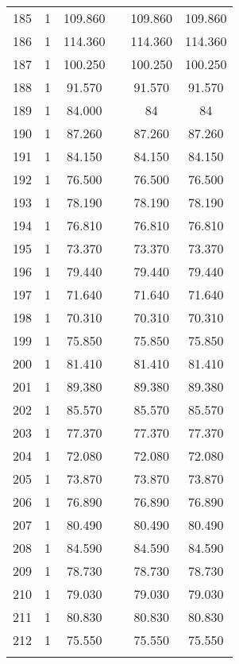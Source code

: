 \begin{table}[!htbp]
\begin{tabular}{@{\extracolsep{5pt}}lccccc}
185 & 1 & 109.860 &  & 109.860 & 109.860 \\ 
186 & 1 & 114.360 &  & 114.360 & 114.360 \\ 
187 & 1 & 100.250 &  & 100.250 & 100.250 \\ 
188 & 1 & 91.570 &  & 91.570 & 91.570 \\ 
189 & 1 & 84.000 &  & 84 & 84 \\ 
190 & 1 & 87.260 &  & 87.260 & 87.260 \\ 
191 & 1 & 84.150 &  & 84.150 & 84.150 \\ 
192 & 1 & 76.500 &  & 76.500 & 76.500 \\ 
193 & 1 & 78.190 &  & 78.190 & 78.190 \\ 
194 & 1 & 76.810 &  & 76.810 & 76.810 \\ 
195 & 1 & 73.370 &  & 73.370 & 73.370 \\ 
196 & 1 & 79.440 &  & 79.440 & 79.440 \\ 
197 & 1 & 71.640 &  & 71.640 & 71.640 \\ 
198 & 1 & 70.310 &  & 70.310 & 70.310 \\ 
199 & 1 & 75.850 &  & 75.850 & 75.850 \\ 
200 & 1 & 81.410 &  & 81.410 & 81.410 \\ 
201 & 1 & 89.380 &  & 89.380 & 89.380 \\ 
202 & 1 & 85.570 &  & 85.570 & 85.570 \\ 
203 & 1 & 77.370 &  & 77.370 & 77.370 \\ 
204 & 1 & 72.080 &  & 72.080 & 72.080 \\ 
205 & 1 & 73.870 &  & 73.870 & 73.870 \\ 
206 & 1 & 76.890 &  & 76.890 & 76.890 \\ 
207 & 1 & 80.490 &  & 80.490 & 80.490 \\ 
208 & 1 & 84.590 &  & 84.590 & 84.590 \\ 
209 & 1 & 78.730 &  & 78.730 & 78.730 \\ 
210 & 1 & 79.030 &  & 79.030 & 79.030 \\ 
211 & 1 & 80.830 &  & 80.830 & 80.830 \\ 
212 & 1 & 75.550 &  & 75.550 & 75.550 \\ 
\hline \\[-1.8ex] 
\end{tabular} 
\end{table} 
